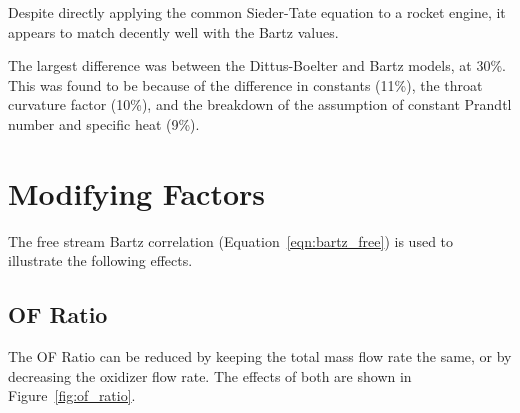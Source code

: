 \documentclass[11pt]{article}
\begin{document}
Despite directly applying the common Sieder-Tate equation to a rocket engine, it appears to match decently well with the Bartz values.

The largest difference was between the Dittus-Boelter and Bartz models, at 30\%. This was found to be because of the difference in constants (11\%), the throat curvature factor (10\%), and the breakdown of the assumption of constant Prandtl number and specific heat (9\%).

\section{Modifying Factors}

The free stream Bartz correlation (Equation~\ref{eqn:bartz_free}) is used to illustrate the following effects.

\subsection{OF Ratio}

The OF Ratio can be reduced by keeping the total mass flow rate the same, or by decreasing the oxidizer flow rate. The effects of both are shown in Figure~\ref{fig:of_ratio}.
\end{document}
